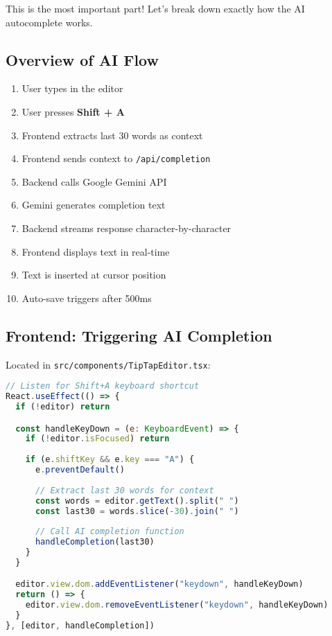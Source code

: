 \documentclass[11pt,a4paper]{article}
\begin{document}
This is the most important part! Let's break down exactly how the AI autocomplete works.

\subsection{Overview of AI Flow}

\begin{tcolorbox}[colback=blue!5!white,colframe=blue!75!black,title=AI Autocomplete Flow]
\begin{enumerate}
    \item User types in the editor
    \item User presses \textbf{Shift + A}
    \item Frontend extracts last 30 words as context
    \item Frontend sends context to \texttt{/api/completion}
    \item Backend calls Google Gemini API
    \item Gemini generates completion text
    \item Backend streams response character-by-character
    \item Frontend displays text in real-time
    \item Text is inserted at cursor position
    \item Auto-save triggers after 500ms
\end{enumerate}
\end{tcolorbox}

\subsection{Frontend: Triggering AI Completion}

Located in \texttt{src/components/TipTapEditor.tsx}:

\begin{lstlisting}[language=JavaScript]
// Listen for Shift+A keyboard shortcut
React.useEffect(() => {
  if (!editor) return

  const handleKeyDown = (e: KeyboardEvent) => {
    if (!editor.isFocused) return
    
    if (e.shiftKey && e.key === "A") {
      e.preventDefault()
      
      // Extract last 30 words for context
      const words = editor.getText().split(" ")
      const last30 = words.slice(-30).join(" ")
      
      // Call AI completion function
      handleCompletion(last30)
    }
  }

  editor.view.dom.addEventListener("keydown", handleKeyDown)
  return () => {
    editor.view.dom.removeEventListener("keydown", handleKeyDown)
  }
}, [editor, handleCompletion])
\end{lstlisting}
\end{document}
